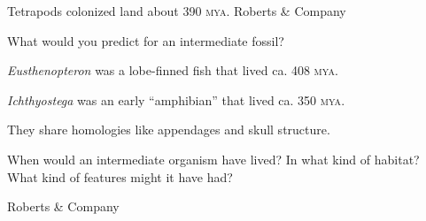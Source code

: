 \documentclass[t]{beamer}
\begin{document}
{
\begin{frame}[b]{Tetrapods colonized land about 390 \textsc{mya}.}
\hfill \tiny \textcopyright Roberts \& Company
\end{frame}
}

{
\begin{frame}[t]{What would you predict for an intermediate fossil?}

\begin{multicols}{2}

\phantom{fred}

\columnbreak

\textit{Eusthenopteron} was a lobe-finned fish that lived ca. 408 \textsc{mya}.

\vspace*{\baselineskip}

\textit{Ichthyostega} was an early “amphibian” that lived ca. 350 \textsc{mya}.

\vspace*{\baselineskip}

They share homologies like appendages and skull structure.

\vspace*{\baselineskip}

When would an intermediate organism have lived? In what kind of habitat? What kind of features might it have had?

\end{multicols}

\vfilll

\hfill \tiny \textcopyright Roberts \& Company
\end{frame}
}
%
\end{document}
